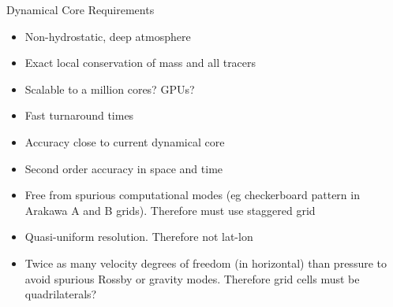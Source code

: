 \begin{slide}{Dynamical Core Requirements}

\begin{itemize}

\item Non-hydrostatic, deep atmosphere

\item Exact local conservation of mass and all tracers

\item Scalable to a million cores? GPUs?

\item Fast turnaround times

\item Accuracy close to current dynamical core

\item Second order accuracy in space and time

\item Free from spurious computational modes (eg checkerboard pattern in Arakawa A and B grids). Therefore must use staggered grid

\item Quasi-uniform resolution. Therefore not lat-lon

\item Twice as many velocity degrees of freedom (in horizontal) than pressure to avoid spurious Rossby or gravity modes. Therefore grid cells must be quadrilaterals?

\end{itemize}

\end{slide}
